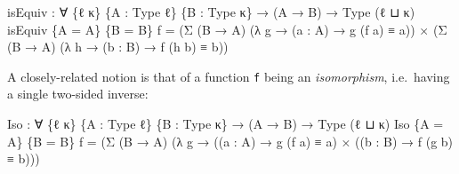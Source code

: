 \documentclass[
  11pt,
  oneside,
  article]{memoir}
\newenvironment{Shaded}{}{}
\newcommand{\NormalTok}[1]{#1}
\newcommand{\OtherTok}[1]{\textcolor[rgb]{0.00,0.44,0.13}{#1}}
\theoremstyle{definition}
\theoremstyle{plain}
\newcommand{\0}{\textsf{0}}
\newcommand{\1}{\tn{\textsf{1}}}
\begin{document}
\begin{Shaded}
\begin{Highlighting}[]
\NormalTok{isEquiv }\OtherTok{:} \OtherTok{∀} \OtherTok{\{}\NormalTok{ℓ κ}\OtherTok{\}} \OtherTok{\{}\NormalTok{A }\OtherTok{:}\NormalTok{ Type ℓ}\OtherTok{\}} \OtherTok{\{}\NormalTok{B }\OtherTok{:}\NormalTok{ Type κ}\OtherTok{\}} \OtherTok{→} \OtherTok{(}\NormalTok{A }\OtherTok{→}\NormalTok{ B}\OtherTok{)} \OtherTok{→}\NormalTok{ Type }\OtherTok{(}\NormalTok{ℓ ⊔ κ}\OtherTok{)}
\NormalTok{isEquiv }\OtherTok{\{}\NormalTok{A }\OtherTok{=}\NormalTok{ A}\OtherTok{\}} \OtherTok{\{}\NormalTok{B }\OtherTok{=}\NormalTok{ B}\OtherTok{\}}\NormalTok{ f }\OtherTok{=}
      \OtherTok{(}\NormalTok{Σ }\OtherTok{(}\NormalTok{B }\OtherTok{→}\NormalTok{ A}\OtherTok{)} \OtherTok{(λ}\NormalTok{ g }\OtherTok{→} \OtherTok{(}\NormalTok{a }\OtherTok{:}\NormalTok{ A}\OtherTok{)} \OtherTok{→}\NormalTok{ g }\OtherTok{(}\NormalTok{f a}\OtherTok{)}\NormalTok{ ≡ a}\OtherTok{))} 
\NormalTok{    × }\OtherTok{(}\NormalTok{Σ }\OtherTok{(}\NormalTok{B }\OtherTok{→}\NormalTok{ A}\OtherTok{)} \OtherTok{(λ}\NormalTok{ h }\OtherTok{→} \OtherTok{(}\NormalTok{b }\OtherTok{:}\NormalTok{ B}\OtherTok{)} \OtherTok{→}\NormalTok{ f }\OtherTok{(}\NormalTok{h b}\OtherTok{)}\NormalTok{ ≡ b}\OtherTok{))}
\end{Highlighting}
\end{Shaded}

A closely-related notion is that of a function \texttt{f} being an
\emph{isomorphism}, i.e.~having a single two-sided inverse:

\begin{Shaded}
\begin{Highlighting}[]
\NormalTok{Iso }\OtherTok{:} \OtherTok{∀} \OtherTok{\{}\NormalTok{ℓ κ}\OtherTok{\}} \OtherTok{\{}\NormalTok{A }\OtherTok{:}\NormalTok{ Type ℓ}\OtherTok{\}} \OtherTok{\{}\NormalTok{B }\OtherTok{:}\NormalTok{ Type κ}\OtherTok{\}} \OtherTok{→} \OtherTok{(}\NormalTok{A }\OtherTok{→}\NormalTok{ B}\OtherTok{)} \OtherTok{→}\NormalTok{ Type }\OtherTok{(}\NormalTok{ℓ ⊔ κ}\OtherTok{)}
\NormalTok{Iso }\OtherTok{\{}\NormalTok{A }\OtherTok{=}\NormalTok{ A}\OtherTok{\}} \OtherTok{\{}\NormalTok{B }\OtherTok{=}\NormalTok{ B}\OtherTok{\}}\NormalTok{ f }\OtherTok{=}
    \OtherTok{(}\NormalTok{Σ }\OtherTok{(}\NormalTok{B }\OtherTok{→}\NormalTok{ A}\OtherTok{)} \OtherTok{(λ}\NormalTok{ g }\OtherTok{→} \OtherTok{((}\NormalTok{a }\OtherTok{:}\NormalTok{ A}\OtherTok{)} \OtherTok{→}\NormalTok{ g }\OtherTok{(}\NormalTok{f a}\OtherTok{)}\NormalTok{ ≡ a}\OtherTok{)} 
\NormalTok{                    × }\OtherTok{((}\NormalTok{b }\OtherTok{:}\NormalTok{ B}\OtherTok{)} \OtherTok{→}\NormalTok{ f }\OtherTok{(}\NormalTok{g b}\OtherTok{)}\NormalTok{ ≡ b}\OtherTok{)))}
\end{Highlighting}
\end{Shaded}
\end{document}
